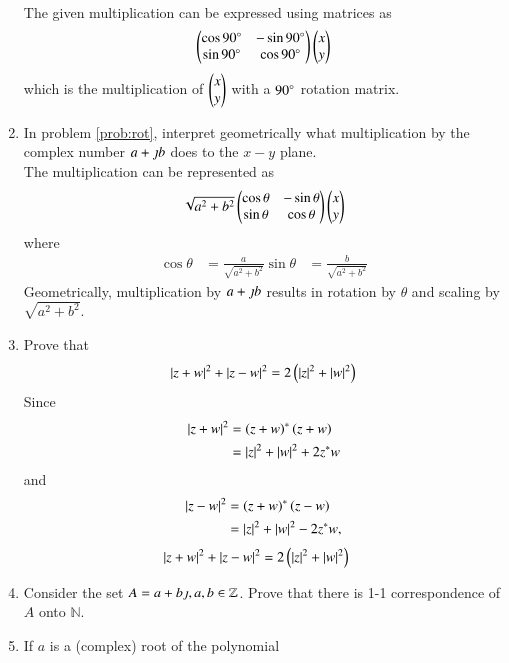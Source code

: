 \begin{enumerate}[label=\arabic*.,ref=\thesubsection.\theenumi]
		\label{prob:rot}
		\\
		\solution The given multiplication can be expressed using matrices as 
		\begin{align}
			\begin{pmatrix}
				\cos 90\degree & -\sin 90\degree
				\\
				\sin 90\degree & \cos 90\degree
			\end{pmatrix}	
			\begin{pmatrix}x \\ y\end{pmatrix}
		\end{align}
		which is the multiplication of $\begin{pmatrix}x\\y\end{pmatrix}$ with a $90\degree$ rotation matrix.
	\item In problem 
		\eqref{prob:rot}, interpret geometrically what multiplication by the complex number $a + \jmath b$ does to the $x-y$ plane.
		\\
		\solution The multiplication can be represented as 
		\begin{align}
			\sqrt{a^2+b^2}
			\begin{pmatrix}
				\cos \theta & -\sin \theta
				\\
				\sin \theta & \cos \theta
			\end{pmatrix}	
			\begin{pmatrix}x \\ y\end{pmatrix}
		\end{align}
		where 
		\begin{align}
			\cos \theta  &= \frac{a}{\sqrt{a^2+b^2}}
			\sin\theta  &= \frac{b}{\sqrt{a^2+b^2}}
		\end{align}
		Geometrically, multiplication by $a+\jmath b$ results in rotation by $\theta$ and scaling by $\sqrt{a^2+b^2}$.
	\item Prove that 
		\begin{align}
			\left\vert z+w\right\vert^2+\left\vert z-w\right\vert^2 = 2\left(\left\vert z\right\vert^2 + \left\vert w\right\vert^2\right)
			\label{eq:pgm}
		\end{align}
		\solution 
		Since 
		\begin{align}
			\left\vert z+w\right\vert^2 &= \left(z+w\right)^{*}\left(z+w\right)
			\\
			&= \left\vert z\right\vert^2 + \left\vert w\right\vert^2 +2z^{*}w
		\end{align}
		and 
		\begin{align}
			\left\vert z-w\right\vert^2 &= \left(z+w\right)^{*}\left(z-w\right)
			\\
			&= \left\vert z\right\vert^2 + \left\vert w\right\vert^2 -2z^{*}w, 
		\end{align}
		\begin{align}
			\left\vert z+w\right\vert^2+\left\vert z-w\right\vert^2 
			&= 2\left(\left\vert z\right\vert^2 + \left\vert w\right\vert^2\right)
		\end{align}
	\item Consider the set $A = a  + b\jmath, a, b \in \mathbb{Z}$. Prove that there is  1-1 correspondence of $A$ onto $\mathbb{N}$.
	\item If $a$ is a (complex) root of the polynomial

\end{enumerate}
